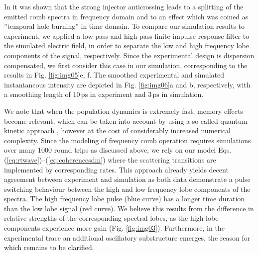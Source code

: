 \documentclass[10pt,letterpaper]{article}%
\begin{document}
\label{sec:timedomain}

In \cite{burghoff2015evaluating} it was shown that the strong injector
anticrossing leads to a splitting of the emitted comb spectra in frequency
domain and to an effect which was coined as ''temporal hole burning'' in time
domain. To compare our simulation results to experiment, we applied a low-pass
and high-pass finite impulse response filter to the simulated electric field,
in order to separate the low and high frequency lobe components of the signal,
respectively. Since the experimental design is dispersion compensated, we
first consider this case in our simulation, corresponding to the results in
Fig. \ref{fig:img05}e, f. The smoothed experimental and simulated
instantaneous intensity are depicted in Fig. \ref{fig:img06}a and b,
respectively, with a smoothing length of\textrm{ }$10{\,}\mathrm{ps}$ in experiment
 and $3{\,}\mathrm{ps}$ in simulation.

We note that when the population dynamics is extremely fast,
memory effects become relevant, which can be taken into account by using a
so-called quantum-kinetic approach \cite{butscher2005ultrafast,iotti2016electronic}, however at the cost of
considerably increased numerical complexity. Since the modeling of frequency comb
operation requires simulations over many 1000 round trips as discussed above,
we rely on our model Eqs. (\ref{eq:rtwave})--(\ref{eq:coherencesdm})
where the scattering transitions are implemented by corresponding rates.
This approach already yields decent agreement between experiment and simulation as both data
demonstrate a pulse switching behaviour between the high and low frequency
lobe components of the spectra. The high frequency lobe pulse (blue curve) has
a longer time duration than the low lobe signal (red curve). We believe this
results from the difference in relative strengths of the corresponding
spectral lobes, as the high lobe components experience more gain (Fig.
\ref{fig:img03}). Furthermore, in the experimental trace an additional
oscillatory substructure emerges, the reason for which remains to be clarified.
\end{document}
